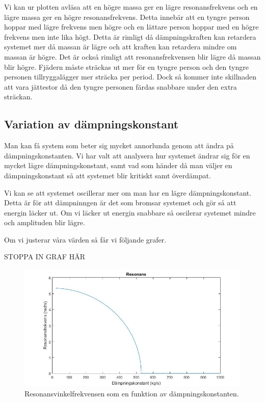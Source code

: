 \documentclass[10pt,a4paper]{article}
\begin{document}
Vi kan ur plotten avläsa att en högre massa ger en lägre resonansfrekvens och en lägre massa ger en högre resonansfrekvens. Detta innebär att en tyngre person hoppar med lägre frekvens men högre och en lättare person hoppar med en högre frekvens men inte lika högt. Detta är rimligt då dämpningskraften kan retardera systemet mer då massan är lägre och att kraften kan retardera mindre om massan är högre. Det är också rimligt att resonansfrekvensen blir lägre då massan blir högre. Fjädern måste sträckas ut mer för en tyngre person och den tyngre personen tillryggalägger mer sträcka per period. Dock så kommer inte skillnaden att vara jättestor då den tyngre personen färdas snabbare under den extra sträckan. 

\subsection{Variation av dämpningskonstant}

Man kan få system som beter sig mycket annorlunda genom att ändra på dämpningskonstanten. Vi har valt att analysera hur systemet ändrar sig för en mycket lägre dämpningskonstant, samt vad som händer då man väljer en dämpningskonstant så att systemet blir kritiskt samt överdämpat. 

Vi kan se att systemet oscillerar mer om man har en lägre dämpningskonstant. Detta är för att dämpninngen är det som bromsar systemet och gör så att energin läcker ut. Om vi läcker ut energin snabbare så oscilerar systemet mindre och amplituden blir lägre.

Om vi justerar våra värden så får vi följande grafer.

STOPPA IN GRAF HÄR


\begin{figure}[h]
\begin{center}
\includegraphics[scale=0.4]{resonansDamp}
\caption{Resonansvinkelfrekvensen som en funktion av dämpningskonstanten.}
\end{center}
\end{figure}
\end{document}
